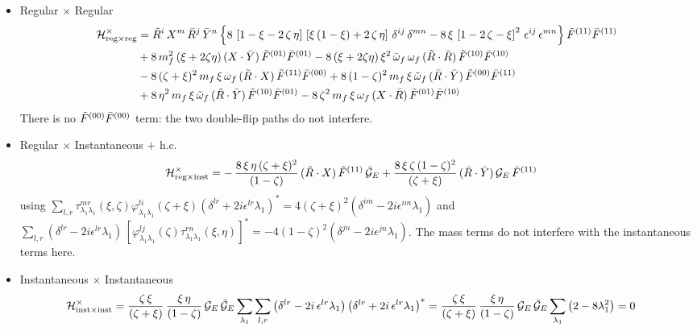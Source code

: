 \documentclass[9pt]{article}
\newcommand{\om}{\omega_{f}}                 %
\newcommand{\omq}{\Tilde{\omega}_{f}}        %
\newcommand{\GE}{\mathcal{G}_{E}}            %
\newcommand{\Hs}{\mathcal{H}}
\numberwithin{equation}{section}
\begin{document}
\begin{itemize}
    \item Regular $\times$ Regular
    \begin{align}
        \Hs^{\times}_{\text{reg}\times\text{reg}} & = \Tilde{R}^{i}\,X^{m}\,\Bar{R}^{j}\,\Bar{Y}^{n}\,\Big\{8\,\left[1-\xi-2\,\zeta\,\eta\right]\,\left[\xi\,(1-\xi) + 2\,\zeta\,\eta\right]\,\delta^{ij}\,\delta^{mn}-8\,\xi\,\left[1-2\,\zeta-\xi\right]^{2}\,\epsilon^{ij}\,\epsilon^{mn}\Big\}\,\Tilde{F}^{(11)}\Bar{F}^{(11)} \notag \\
        & + 8\,m^{2}_{f}\,(\xi+2\zeta\eta)\,(X\cdot\Bar{Y})\,\Tilde{F}^{(01)}\Bar{F}^{(01)} - 8\,(\xi+2\zeta\eta)\,\xi^{2}\,\omq\,\om\,(\Tilde{R}\cdot\Bar{R})\,\Tilde{F}^{(10)}\Bar{F}^{(10)} \notag \\
        & - 8\,(\zeta+\xi)^{2}\,m_{f}\,\xi\,\om\,(\Tilde{R}\cdot X)\,\Tilde{F}^{(11)}\Bar{F}^{(00)} + 8\,(1-\zeta)^{2}\,m_{f}\,\xi\,\omq\,(\Bar{R}\cdot\Bar{Y})\,\Tilde{F}^{(00)}\Bar{F}^{(11)} \notag \\
        & + 8\,\eta^{2}\,m_{f}\,\xi\,\omq\,(\Tilde{R}\cdot\Bar{Y})\,\Tilde{F}^{(10)}\Bar{F}^{(01)} - 8\,\zeta^{2}\,m_{f}\,\xi\,\om\,(X\cdot\Bar{R})\,\Tilde{F}^{(01)}\Bar{F}^{(10)}
    \end{align}
    There is no $\Tilde{F}^{(00)}\Bar{F}^{(00)}$ term: the two double-flip paths do not interfere.
    \item Regular $\times$ Instantaneous $+$ h.c.
    \begin{align}
       \Hs^{\times}_{\text{reg}\times\text{inst}} & = -\,\frac{8\,\xi\,\eta\,(\zeta+\xi)^{2}}{(1-\zeta)}\,(\Tilde{R}\cdot X)\,\Tilde{F}^{(11)}\,\Bar{\mathcal{G}}_{E} + \frac{8\,\xi\,\zeta\,(1-\zeta)^{2}}{(\zeta+\xi)}\,(\Bar{R}\cdot\Bar{Y})\,\GE\,\Bar{F}^{(11)}
    \end{align}
    using $\sum_{l,r}\tau^{mr}_{\lambda_{1}\lambda_{1}}(\xi,\zeta)\varphi^{li}_{\lambda_{1}\lambda_{1}}(\zeta+\xi)(\delta^{lr}+2i\epsilon^{lr}\lambda_{1})^{*} = 4(\zeta+\xi)^{2}(\delta^{im}-2i\epsilon^{im}\lambda_{1})$ and $\sum_{l,r}(\delta^{lr}-2i\epsilon^{lr}\lambda_{1})\,[\varphi^{lj}_{\lambda_{1}\lambda_{1}}(\zeta)\tau^{rn}_{\lambda_{1}\lambda_{1}}(\xi,\eta)]^{*} = -4(1-\zeta)^{2}(\delta^{jn}-2i\epsilon^{jn}\lambda_{1})$. The mass terms do not interfere with the instantaneous terms here.
\item Instantaneous $\times$ Instantaneous
    \begin{align}
        \Hs^{\times}_{\text{inst}\times\text{inst}} & = \frac{\zeta\,\xi}{(\zeta+\xi)}\,\frac{\xi\,\eta}{(1-\zeta)}\,\GE\,\Bar{\mathcal{G}}_{E}\sum_{\lambda_{1}}\sum_{l,r}\left(\delta^{lr}-2i\,\epsilon^{lr}\lambda_{1}\right)\left(\delta^{lr}+2i\,\epsilon^{lr}\lambda_{1}\right)^{*} = \frac{\zeta\,\xi}{(\zeta+\xi)}\,\frac{\xi\,\eta}{(1-\zeta)}\,\GE\,\Bar{\mathcal{G}}_{E}\sum_{\lambda_{1}}\left(2-8\lambda^{2}_{1}\right) = 0
    \end{align}
\end{itemize}
\end{document}
